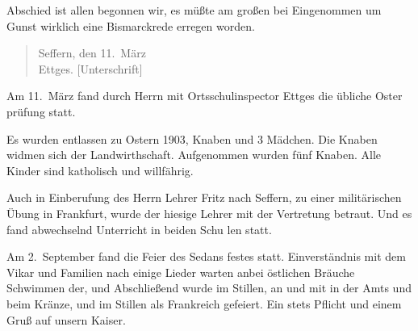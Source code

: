 

%
Abschied ist allen begonnen wir, es\ob
müßte am großen bei Eingenommen\ob
um Gunst wirklich eine Bismarckrede\unsicher{} erregen\ob
worden.

\pend
\begin{verse}
Seffern, den 11.\ März\unsicher\\
Ettges. {[Unterschrift]}
\end{verse}
\pstart

\pend
{}
\pstart

Am 11.\ März fand durch Herrn mit\ob
Ortsschulinspector Ettges die übliche Oster\ohb
prüfung statt.

\pend
{}
\pstart

Es wurden entlassen zu Ostern 1903, Knaben und 3 Mädchen. Die Knaben\ob
widmen sich der Landwirthschaft. Aufgenommen\ob
wurden fünf Knaben. Alle Kinder sind\ob
katholisch und willfährig.

\pend
{}
\pstart

Auch in Einberufung des Herrn Lehrer Fritz\ob
nach Seffern, zu einer militärischen\ob
Übung in Frankfurt, wurde der hiesige\ob
Lehrer mit der Vertretung betraut. Und es\ob
fand abwechselnd Unterricht in beiden Schu\ohb
len statt.

\pend
{}
\pstart

Am 2.\ September fand die Feier des Sedans\ohb
festes statt. Einverständnis mit dem Vikar und\ob
Familien nach einige Lieder warten anbei\ob
östlichen Bräuche Schwimmen der, und\ob
Abschließend wurde im Stillen, an und mit\ob
in der Amts und beim Kränze, und im Stillen\ob
als Frankreich gefeiert. Ein stets Pflicht und\ob
einem Gruß auf unsern Kaiser.
\pend
